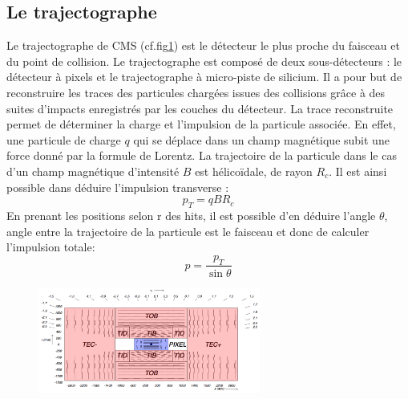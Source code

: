 \subsection{Le trajectographe}
Le trajectographe de CMS (cf.fig\ref{trajectographe}) est le détecteur le plus proche du faisceau et du point de collision. Le trajectographe est composé de deux sous-détecteurs : le détecteur à pixels et le trajectographe à micro-piste de silicium. Il a pour but de reconstruire les traces des particules chargées issues des collisions grâce à des suites d'impacts enregistrés par les couches du détecteur. La trace reconstruite permet de déterminer la charge et l'impulsion de la particule associée. En effet, une particule de charge $q$ qui se déplace dans un champ magnétique subit une force donné par la formule de Lorentz. La trajectoire de la particule dans le cas d'un champ magnétique d'intensité $B$ est hélicoïdale, de rayon $R_{c}$. Il est ainsi possible dans déduire l'impulsion transverse :
\begin{equation}
p_{T}=qBR_{c}
\end{equation}
En prenant les positions selon r des hits, il est possible d'en déduire l'angle $\theta$, angle entre la trajectoire de la particule est le faisceau et donc de calculer l'impulsion totale:
\begin{equation}
p=\frac{p_{T}}{\sin\theta}
\end{equation}
\begin{figure}[ht!]
	\centering
	\includegraphics[width=0.65\textwidth]{CMS/tracker.png}
	\label{trajectographe}
\end{figure}

